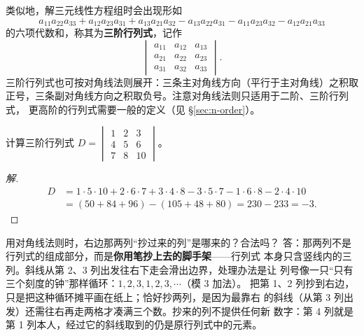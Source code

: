 类似地，解三元线性方程组时会出现形如
\[
  a_{11}a_{22}a_{33}+a_{12}a_{23}a_{31}+a_{13}a_{21}a_{32}
  -a_{13}a_{22}a_{31}-a_{11}a_{23}a_{32}-a_{12}a_{21}a_{33}
\]
的六项代数和，称其为\textbf{三阶行列式}，记作
\[
  \begin{vmatrix}
    a_{11} & a_{12} & a_{13} \\
    a_{21} & a_{22} & a_{23} \\
    a_{31} & a_{32} & a_{33}
  \end{vmatrix}.
\]
三阶行列式也可按对角线法则展开：三条主对角线方向（平行于主对角线）之积取
正号，三条副对角线方向之积取负号。注意对角线法则只适用于二阶、三阶行列式，
更高阶的行列式需要一般的定义（见 \S\ref{sec:n-order}）。

\begin{example}
计算三阶行列式
$D=\begin{vmatrix} 1 & 2 & 3 \\ 4 & 5 & 6 \\ 7 & 8 & 10 \end{vmatrix}$。
\end{example}
\begin{proof}[解]
\begin{align*}
  D &= 1\cdot 5\cdot 10 + 2\cdot 6\cdot 7 + 3\cdot 4\cdot 8
       - 3\cdot 5\cdot 7 - 1\cdot 6\cdot 8 - 2\cdot 4\cdot 10 \\
    &= (50+84+96)-(105+48+80) = 230-233 = -3 .
\end{align*}
\end{proof}

\begin{qa}{用对角线法则时，右边那两列“抄过来的列”是哪来的？合法吗？}
答：那两列不是行列式的组成部分，而是\textbf{你用笔抄上去的脚手架}——行列式
本身只含竖线内的三列。斜线从第 2、3 列出发往右下走会滑出边界，处理办法是让
列号像一只“只有三个刻度的钟”那样循环：$1,2,3,1,2,3,\cdots$（模 $3$ 加法）。
把第 1、2 列抄到右边，只是把这种循环摊平画在纸上；恰好抄两列，是因为最靠右
的斜线（从第 3 列出发）还需往右再走两格才凑满三个数。抄来的列不提供任何新
数字：第 4 列就是第 1 列本人，经过它的斜线取到的仍是原行列式中的元素。
\end{qa}

